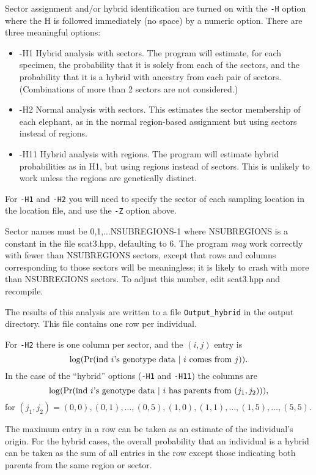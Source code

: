 \documentclass[10pt,titlepage,times,letterpaper]{article}
\def \Pr{{\rm Pr}}
\begin{document}
Sector assignment and/or hybrid identification are
turned on with the {\tt -H} option where the H is
followed immediately (no space) by a numeric option.  There are three
meaningful options:

\begin{itemize}
\item -H1 Hybrid analysis with sectors.  The program will estimate,
for each specimen, the probability that it is solely from each of the
sectors, and the probability that it is a hybrid with ancestry from
each pair of sectors.  (Combinations of more than 2 sectors are
not considered.)
\item -H2  Normal analysis with sectors.   This estimates the
sector membership of each elephant, as in the normal region-based
assignment but using sectors instead of regions.  
\item -H11 Hybrid analysis with regions.  The program will estimate 
hybrid probabilities as in H1, but using regions instead of sectors.  
This is unlikely to work unless the regions are genetically distinct.
\end{itemize}

For {\tt -H1} and {\tt -H2} you will need to specify the sector of
each sampling location in the location file, and use the {\tt -Z} option above. 

Sector names must be 0,1,...NSUBREGIONS-1 where NSUBREGIONS is a
constant in the file scat3.hpp, defaulting to 6.  The program {\it may}
work correctly with fewer than NSUBREGIONS sectors, except that 
rows and columns corresponding to those sectors will be meaningless; it
is likely to crash with more than NSUBREGIONS sectors.  To adjust this
number, edit scat3.hpp and recompile.

The results of this analysis are written to a file {\tt Output\_hybrid} in
the output directory.  This file contains one row per individual.

For {\tt -H2} there is one column per sector, and the $(i,j)$ entry
is $$\log(\Pr(\text{ind $i$'s genotype data $\mid$ $i$ comes from $j$})).$$
In the case of the ``hybrid'' options ({\tt -H1} and {\tt -H11}) the columns are
$$\log(\Pr(\text{ind $i$'s genotype data $\mid$ $i$ has parents from $(j_1,j_2)$})),$$
for $(j_1,j_2) = (0,0), (0,1),\dots,(0,5),(1,0),(1,1),\dots,(1,5),\dots, (5,5)$.

The maximum entry in a row can be taken as an estimate of the individual's
origin.  For the hybrid cases, the overall probability that an individual is
a hybrid can be taken as the sum of all entries in the row except those indicating
both parents from the same region or sector.
\end{document}
